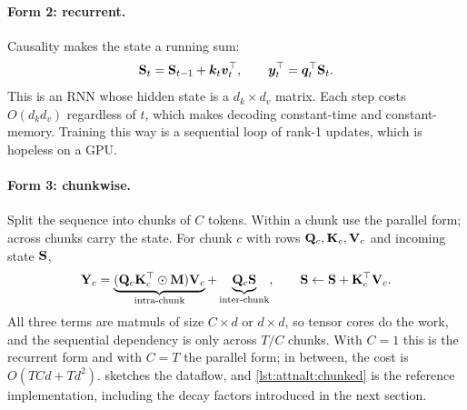 \paragraph{Form 2: recurrent.} Causality makes the state a running sum:
\begin{equation}
\mathbf{S}_t=\mathbf{S}_{t-1}+\bm{k}_t\bm{v}_t^\top,\qquad \bm{y}_t^\top=\bm{q}_t^\top\mathbf{S}_t .
\label{eq:attnalt:recurrent}
\end{equation}
This is an RNN whose hidden state is a $d_k\times d_v$ matrix. Each step costs $O(d_kd_v)$ regardless of
$t$, which makes decoding constant-time and constant-memory. Training this way is a sequential loop of
rank-1 updates, which is hopeless on a GPU.

\paragraph{Form 3: chunkwise.} Split the sequence into chunks of $C$ tokens. Within a chunk use the parallel
form; across chunks carry the state. For chunk $c$ with rows $\mathbf{Q}_c,\mathbf{K}_c,\mathbf{V}_c$ and incoming
state $\mathbf{S}$,
\begin{equation}
\mathbf{Y}_c=\underbrace{(\mathbf{Q}_c\mathbf{K}_c^\top\odot\mathbf{M})\mathbf{V}_c}_{\text{intra-chunk}}
+\underbrace{\mathbf{Q}_c\mathbf{S}}_{\text{inter-chunk}},
\qquad
\mathbf{S}\leftarrow\mathbf{S}+\mathbf{K}_c^\top\mathbf{V}_c .
\label{eq:attnalt:chunk}
\end{equation}
All three terms are matmuls of size $C\times d$ or $d\times d$, so tensor cores do the work, and the
sequential dependency is only across $T/C$ chunks. With $C=1$ this is the recurrent form and with $C=T$
the parallel form; in between, the cost is $O(TCd+Td^2)$.  sketches the dataflow,
and \cref{lst:attnalt:chunked} is the reference implementation, including the decay factors introduced
in the next section.

